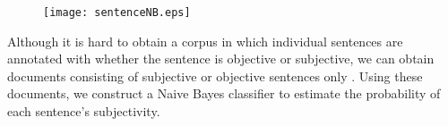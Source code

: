 \documentclass[japanese]{jnlp_1.3d}
\begin{document}
\begin{figure}[t]
\centering
\texttt{[image: sentenceNB.eps]}\\
\label{fig:sNB}
\end{figure}

Although it is hard to obtain a corpus in which individual sentences are annotated with whether the sentence is objective or subjective, we can obtain documents consisting of subjective or objective sentences only \cite{Pang2004}. Using these documents, we construct a Naive Bayes classifier to estimate the probability of each sentence's subjectivity. 
\end{document}
